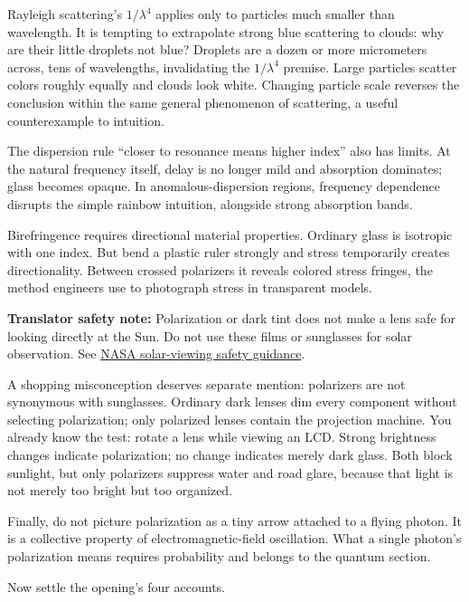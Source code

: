 Rayleigh scattering's \(1/\lambda^4\) applies only to particles much smaller than wavelength. It is tempting to extrapolate strong blue scattering to clouds: why are their little droplets not blue? Droplets are a dozen or more micrometers across, tens of wavelengths, invalidating the \(1/\lambda^4\) premise. Large particles scatter colors roughly equally and clouds look white. Changing particle scale reverses the conclusion within the same general phenomenon of scattering, a useful counterexample to intuition.

The dispersion rule ``closer to resonance means higher index'' also has limits. At the natural frequency itself, delay is no longer mild and absorption dominates; glass becomes opaque. In anomalous-dispersion regions, frequency dependence disrupts the simple rainbow intuition, alongside strong absorption bands.

Birefringence requires directional material properties. Ordinary glass is isotropic with one index. But bend a plastic ruler strongly and stress temporarily creates directionality. Between crossed polarizers it reveals colored stress fringes, the method engineers use to photograph stress in transparent models.

\textbf{Translator safety note:} Polarization or dark tint does not make a lens safe for looking directly at the Sun. Do not use these films or sunglasses for solar observation. See \href{https://science.nasa.gov/eclipses/safety/}{NASA solar-viewing safety guidance}.

A shopping misconception deserves separate mention: polarizers are not synonymous with sunglasses. Ordinary dark lenses dim every component without selecting polarization; only polarized lenses contain the projection machine. You already know the test: rotate a lens while viewing an LCD. Strong brightness changes indicate polarization; no change indicates merely dark glass. Both block sunlight, but only polarizers suppress water and road glare, because that light is not merely too bright but too organized.

Finally, do not picture polarization as a tiny arrow attached to a flying photon. It is a collective property of electromagnetic-field oscillation. What a single photon's polarization means requires probability and belongs to the quantum section.


Now settle the opening's four accounts.

